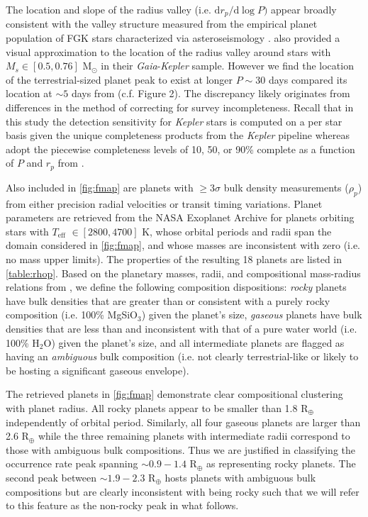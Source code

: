 \documentclass[twocolumn]{emulateapj}
\newcommand{\gaia}[1]{\emph{Gaia}#1}
\newcommand{\kepler}[1]{\emph{Kepler}#1}
\newcommand{\teff}[1]{$T_{\text{eff}}$#1}
\begin{document}
The location and slope of the radius valley (i.e. $\text{d}r_p/\text{d}\log{P})$ appear broadly consistent
with the valley structure measured from the empirical planet population of FGK stars characterized via
asteroseismology \citep{vaneylen18}. \cite{wu19} also provided a visual approximation to the location of the
radius valley around stars with $M_s \in [0.5,0.76]$ M$_{\odot}$ in their \gaia{-}\kepler{} sample. However
we find the location of the terrestrial-sized planet peak to exist at longer $P \sim 30$ days compared its
location at $\sim 5$ days from \cite{wu19} (c.f. Figure 2). The discrepancy likely originates from differences
in the method of correcting for survey incompleteness.
Recall that in this study the detection sensitivity for \kepler{} stars is computed on a per star basis
given the unique completeness products from the \kepler{} pipeline whereas \cite{wu19} adopt the piecewise
completeness levels of 10, 50, or 90\% complete as a function of $P$ and $r_p$ from \cite{zhu18b}.

Also included in \autoref{fig:fmap} are planets
with $\geq 3\sigma$ bulk density measurements ($\rho_p$) from either precision radial velocities or
transit timing variations.
Planet parameters are retrieved from the NASA Exoplanet Archive for planets orbiting stars with
\teff{} $\in[2800,4700]$ K, whose orbital periods and radii span the domain considered in \autoref{fig:fmap},
and whose masses are inconsistent with zero (i.e. no mass upper limits).
The properties of the resulting 18 planets are listed in \autoref{table:rhop}. Based on the
planetary masses, radii, and compositional mass-radius relations from \cite{zeng13},
we define the following composition dispositions: \emph{rocky}
planets have bulk densities that are greater than or consistent with a purely rocky composition
(i.e. 100\% MgSiO$_3$) given the planet's size, \emph{gaseous} planets have bulk densities that are less
than and inconsistent with that of a pure water world (i.e. 100\% H$_2$O) given the planet's size, 
and all intermediate planets are flagged as having an \emph{ambiguous} bulk composition (i.e. not clearly
terrestrial-like or likely to be hosting a significant gaseous envelope).



The retrieved planets in \autoref{fig:fmap} demonstrate clear compositional clustering with planet radius.
All rocky planets appear to be smaller than 1.8 R$_{\oplus}$ independently of orbital period.
Similarly, all four gaseous planets are larger than 2.6 R$_{\oplus}$ while the three remaining planets
with intermediate radii correspond to those with ambiguous bulk compositions. 
Thus we are justified in classifying the occurrence rate peak spanning $\sim 0.9-1.4$ R$_{\oplus}$
as representing rocky planets. The second peak between $\sim 1.9-2.3$ R$_{\oplus}$ hosts
planets with ambiguous bulk compositions but are clearly inconsistent with being rocky
such that we will refer to this feature as the non-rocky peak in what follows.
\end{document}
